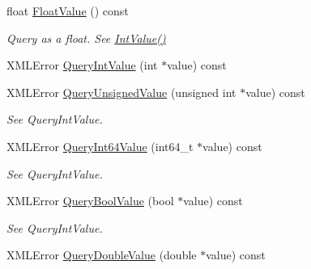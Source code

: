 \begin{DoxyCompactItemize}
float \mbox{\hyperlink{classtinyxml2_1_1XMLAttribute_a27797b45d21c981257720db94f5f8801}{Float\+Value}} () const
\begin{DoxyCompactList}\small\item\em Query as a float. See \mbox{\hyperlink{classtinyxml2_1_1XMLAttribute_adfa2433f0fdafd5c3880936de9affa80}{Int\+Value()}} \end{DoxyCompactList}\item 
X\+M\+L\+Error \mbox{\hyperlink{classtinyxml2_1_1XMLAttribute_a6d5176260db00ea301c01af8457cd993}{Query\+Int\+Value}} (int $\ast$value) const
\item 
\mbox{\label{classtinyxml2_1_1XMLAttribute_a48a7f3496f1415832e451bd8d09c9cb9}} 
X\+M\+L\+Error \mbox{\hyperlink{classtinyxml2_1_1XMLAttribute_a48a7f3496f1415832e451bd8d09c9cb9}{Query\+Unsigned\+Value}} (unsigned int $\ast$value) const
\begin{DoxyCompactList}\small\item\em See Query\+Int\+Value. \end{DoxyCompactList}\item 
\mbox{\label{classtinyxml2_1_1XMLAttribute_a4e25344d6e4159026be34dbddf1dcac2}} 
X\+M\+L\+Error \mbox{\hyperlink{classtinyxml2_1_1XMLAttribute_a4e25344d6e4159026be34dbddf1dcac2}{Query\+Int64\+Value}} (int64\+\_\+t $\ast$value) const
\begin{DoxyCompactList}\small\item\em See Query\+Int\+Value. \end{DoxyCompactList}\item 
\mbox{\label{classtinyxml2_1_1XMLAttribute_a5f32e038954256f61c21ff20fd13a09c}} 
X\+M\+L\+Error \mbox{\hyperlink{classtinyxml2_1_1XMLAttribute_a5f32e038954256f61c21ff20fd13a09c}{Query\+Bool\+Value}} (bool $\ast$value) const
\begin{DoxyCompactList}\small\item\em See Query\+Int\+Value. \end{DoxyCompactList}\item 
\mbox{\label{classtinyxml2_1_1XMLAttribute_a2aa6e55e8ea03af0609cf6690bff79b9}} 
X\+M\+L\+Error \mbox{\hyperlink{classtinyxml2_1_1XMLAttribute_a2aa6e55e8ea03af0609cf6690bff79b9}{Query\+Double\+Value}} (double $\ast$value) const

\end{DoxyCompactItemize}
